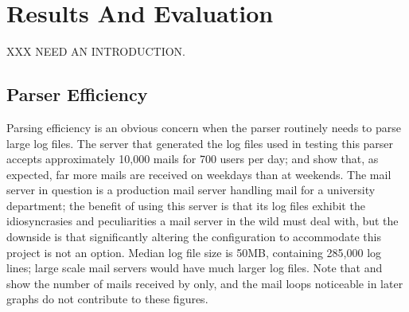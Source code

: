 \chapter{Results And Evaluation}

\label{Results}

\renewcommand{\figurename}{Graph}

\addtolength{\tabcolsep}{-1pt}

XXX NEED AN INTRODUCTION\@.

\section{Parser Efficiency}

\label{parser efficiency}

Parsing efficiency is an obvious concern when the parser routinely needs to
parse large log files.  The server that generated the log files used in
testing this parser accepts approximately 10,000 mails for 700 users per
day;  and  show that, as expected, far more mails are
received on weekdays than at weekends.  The mail server in question is a
production mail server handling mail for a university department; the
benefit of using this server is that its log files exhibit the
idiosyncrasies and peculiarities a mail server in the wild must deal with,
but the downside is that significantly altering the configuration to
accommodate this project is not an option.  Median log file size is 50MB,
containing 285,000 log lines; large scale mail servers would have much
larger log files.  Note that  and
 show the number of
mails received by  only, and the mail loops noticeable in
later graphs do not contribute to these figures.



